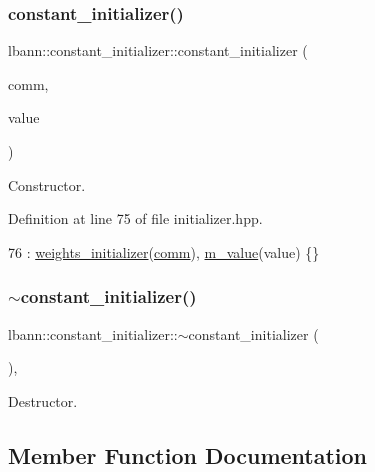 \subsubsection{\texorpdfstring{constant\+\_\+initializer()}{constant\_initializer()}}
{\footnotesize\ttfamily lbann\+::constant\+\_\+initializer\+::constant\+\_\+initializer (\begin{DoxyParamCaption}\item[{\hyperlink{classlbann_1_1lbann__comm}{lbann\+\_\+comm} $\ast$}]{comm,  }\item[{Data\+Type}]{value }\end{DoxyParamCaption})\hspace{0.3cm}{\ttfamily [inline]}}

Constructor. 

Definition at line 75 of file initializer.\+hpp.


\begin{DoxyCode}
76     : \hyperlink{classlbann_1_1weights__initializer_a3b65043cb6d76dcfcb07387392429755}{weights\_initializer}(\hyperlink{file__io_8cpp_ab048c6f9fcbcfaa57ce68b00263dbebe}{comm}), \hyperlink{classlbann_1_1constant__initializer_ac0f04ad951799fa970f3dea78988cdb5}{m\_value}(value) \{\}
\end{DoxyCode}
\mbox{\label{classlbann_1_1constant__initializer_af134f1b82a60829d9fdf2eabc32356ed}} 
\subsubsection{\texorpdfstring{$\sim$constant\+\_\+initializer()}{~constant\_initializer()}}
{\footnotesize\ttfamily lbann\+::constant\+\_\+initializer\+::$\sim$constant\+\_\+initializer (\begin{DoxyParamCaption}{ }\end{DoxyParamCaption})\hspace{0.3cm}{\ttfamily [override]}, {\ttfamily [default]}}

Destructor. 

\subsection{Member Function Documentation}
\mbox{\label{classlbann_1_1constant__initializer_a1af9be89f528045f47abf13818d814ce}} 
